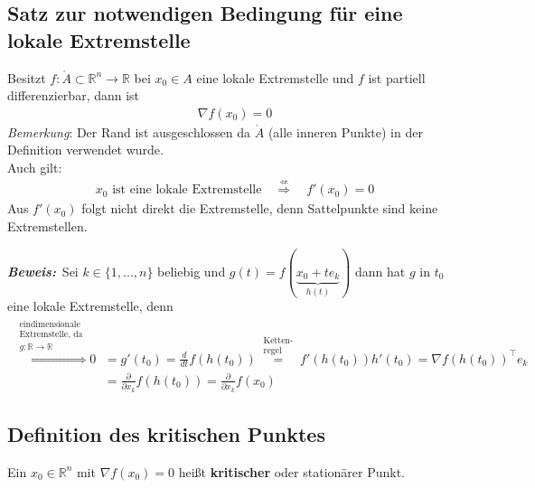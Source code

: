 \documentclass[11pt,a4paper]{book}
\newcommand {\R}	{\mathbb{R}}
\newcommand {\Rn}	{\mathbb{R}^n}
\newcommand{\1}    	{\mathbbm{1}}
\newcommand{\Beweis}[1][Beweis]
{\begin{mdframed}[backgroundcolor=gray!10,linewidth=0pt]\noindent\textit{\textbf{{#1}:}}~}
\newcommand{\QED}	{\end{mdframed}}
\begin{document}
\subsection{Satz zur notwendigen Bedingung für eine lokale Extremstelle}
Besitzt \(f: \mathring{A} \subset \Rn \rightarrow \R \) bei \(x_0 \in A\) eine lokale Extremstelle und \(f\) ist partiell differenzierbar, dann ist
\begin{align*}
	\nabla f(x_0) = 0
\end{align*}
\textit{Bemerkung}: Der Rand ist ausgeschlossen da \(\mathring{A}\) (alle inneren Punkte) in der Definition verwendet wurde.\\
Auch gilt:
\begin{align*}
	x_0 \textrm{ ist eine lokale Extremstelle}
	\quad \stackrel{\not\Leftarrow}{\Rightarrow} \quad
	f'(x_0) = 0
\end{align*}
Aus \(f'(x_0)\) folgt nicht direkt die Extremstelle, denn Sattelpunkte sind keine Extremstellen. \\

\noindent
\Beweis Sei \(k \in \{1, ..., n\}\) beliebig und \(g(t) = f\left(\underbrace{x_0 + t e_k}_{h(t)}\right)\) dann hat \(g\) in \(t_0\) eine lokale Extremstelle, denn
\begin{align*}
	\stackrel{\substack{
		\textrm{eindimensionale}\\
		\textrm{Extremstelle, da}\\
		g: \R \rightarrow \R
	}}{\Rightarrow}
	0 &= g'(t_0) = \frac{d}{dt} f(h(t_0)) 
	\stackrel{\substack{\textrm{Ketten-}\\\textrm{regel}}}{=} f'(h(t_0)) h'(t_0) = \nabla f(h(t_0))^\top e_k \\
	&= \frac{\partial}{\partial x_k} f(h(t_0)) = \frac{\partial}{\partial x_k} f(x_0)
\end{align*}
\QED

\subsection{Definition des kritischen Punktes}

Ein \(x_0 \in \Rn \) mit \(\nabla f(x_0) = 0\) heißt \textbf{kritischer} oder stationärer Punkt.  
\end{document}
